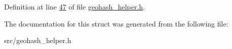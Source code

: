 Definition at line \hyperlink{geohash__helper_8h_source_l00047}{47} of file \hyperlink{geohash__helper_8h_source}{geohash\+\_\+helper.\+h}.



The documentation for this struct was generated from the following file\+:\begin{DoxyCompactItemize}
\item 
src/geohash\+\_\+helper.\+h\end{DoxyCompactItemize}

